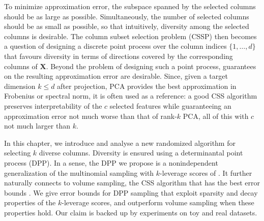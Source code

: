 \documentclass[twoside,11pt]{book}
\numberwithin{theorem}{chapter}
\numberwithin{definition}{chapter}
\numberwithin{proposition}{chapter}
\numberwithin{corollary}{chapter}
\numberwithin{example}{chapter}
\numberwithin{lemma}{chapter}
\numberwithin{assumption}{chapter}
\numberwithin{equation}{chapter}
\numberwithin{figure}{chapter}
\newcommand{\pc}[1]{\textcolor{blue}{#1}}
\begin{document}
To minimize approximation error, the subspace spanned by the selected columns should be as large as possible. Simultaneously, the number of selected columns should be as small as possible, so that intuitively, diversity among the selected columns is desirable. The column subset selection problem (CSSP) then becomes a question of designing a discrete point process over the column indices $\{1,\dots,d\}$ that favours diversity in terms of directions covered by the corresponding columns of $\bm{X}$.
Beyond the problem of designing such a point process, guarantees on the resulting approximation error are desirable. Since, given a target dimension $k\leq d$ after projection, PCA provides the best approximation in Frobenius or spectral norm, it is often used as a reference: a good CSS algorithm preserves interpretability of the $c$ selected features while guaranteeing an approximation error not much worse than that of rank-$k$ PCA, all of this with $c$ not much larger than $k$.

In this chapter, we introduce and analyse a new randomized algorithm for selecting $k$ diverse columns. Diversity is ensured using a determinantal point process (DPP). 
In a sense, the DPP we propose is a nonindependent generalization of the multinomial sampling with $k$-leverage scores of \cite{BoMaDr09}. It further naturally connects to volume sampling, the CSS algorithm that has the best error bounds \parencite{DRVW06}. We give error bounds for DPP sampling that exploit sparsity and decay properties of the $k$-leverage scores, and outperform volume sampling when these properties hold. Our claim is backed up by experiments on toy and real datasets.
\end{document}

